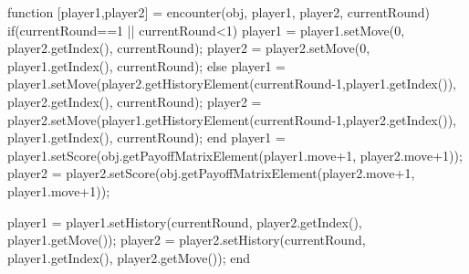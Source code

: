 \begin{}
function [player1,player2] = encounter(obj, player1, player2, currentRound)
    if(currentRound==1 || currentRound<1)
        player1 = player1.setMove(0, player2.getIndex(), currentRound); %
        player2 = player2.setMove(0, player1.getIndex(), currentRound); %
    else
        player1 = player1.setMove(player2.getHistoryElement(currentRound-1,player1.getIndex()), player2.getIndex(), currentRound); %
        player2 = player2.setMove(player1.getHistoryElement(currentRound-1,player2.getIndex()), player1.getIndex(), currentRound); %
    end
    player1 = player1.setScore(obj.getPayoffMatrixElement(player1.move+1, player2.move+1));
    player2 = player2.setScore(obj.getPayoffMatrixElement(player2.move+1, player1.move+1));

    player1 = player1.setHistory(currentRound, player2.getIndex(), player1.getMove());
    player2 = player2.setHistory(currentRound, player1.getIndex(), player2.getMove());
end
\end{}

